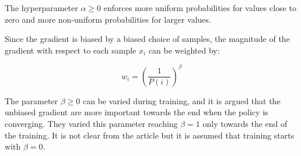 The hyperparameter $\alpha \geq 0$ enforces more uniform probabilities for values close to
zero and more non-uniform probabilities for larger values.

Since the gradient is biased by a biased choice of samples, the magnitude of
the gradient with respect to each sample $x_i$ can be weighted by:

\begin{equation}
    w_i = \left( \frac{1}{P(i)} \right)^\beta
\end{equation}

The parameter $\beta \geq 0$ can be varied during training, and it is argued that
the unbiased gradient are more important towards the end when the policy is
converging. They varied this parameter reaching $\beta = 1$ only towards the
end of the training. It is not clear from the article but it is assumed that
training starts with $\beta = 0$.

%
%
%
%
%
